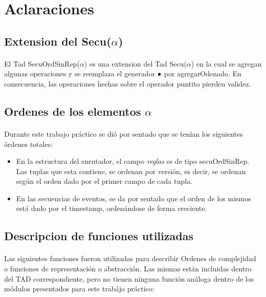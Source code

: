 \section*{Aclaraciones}

\subsection*{Extension del Secu($\alpha$)}
\paragraph{}
El Tad SecuOrdSinRep($\alpha$) es una extension del Tad Secu($\alpha$) en la cual se agregan algunas operaciones y se reemplaza el generador $\bullet$ por agregarOdenado. En consecuencia, las operaciones hechas sobre el operador puntito pierden validez.

\subsection*{Ordenes de los elementos $\alpha$}
\paragraph{}
Durante este trabajo pr\'actico se di\'o por sentado que se ten\'ian los siguientes \'ordenes totales:

\begin{itemize}
\item En la estructura del enrutador, el campo \textit{reglas} es de tipo secuOrdSinRep. Las tuplas que esta contiene, se ordenan por versi\'on, es decir, se ordenan seg\'un el orden dado por el primer campo de cada tupla.
\item En las secuencias de eventos, se da por sentado que el orden de los mismos est\'a dado por el timestamp, orden\'andose de forma creciente.
\end{itemize}






\subsection*{Descripcion de funciones utilizadas}
\paragraph{}
Las siguientes funciones fueron utilizadas para describir Ordenes de complejidad o funciones de representaci\'on o abstracci\'on. Las mismas est\'an incluidas dentro del TAD correspondiente, pero no tienen ninguna funci\'on an\'aloga dentro de los m\'odulos presentados para este trab\'ajo pr\'actico:


